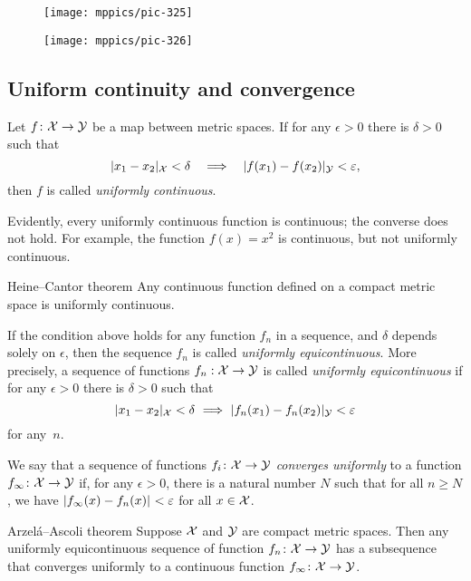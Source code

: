 \begin{multicols}{2}
{\begin{figure*}[b!]
\begin{minipage}{.48\textwidth}
\centering
\texttt{[image: mppics/pic-325]}
\end{minipage}\hfill
\begin{minipage}{.48\textwidth}
\centering
\texttt{[image: mppics/pic-326]}
\end{minipage}
\end{figure*}

\subsection*{Uniform continuity and convergence}

Let $f\colon{\mathcal{X}}\to \mathcal{Y}$ be a map between metric spaces.
If  for any $\epsilon>0$ there is $\delta>0$ such that 
\[\dist{x_1}{x_2}{\spc{X}}<\delta\quad\Longrightarrow\quad \dist{f(x_1)}{f(x_2)}{\spc{Y}}<\epsilon,\]
then $f$ is called \emph{uniformly continuous}.

Evidently, every uniformly continuous function is continuous;
the converse does not hold.
For example, the function $f(x)=x^2$ is continuous, but not uniformly continuous.

\begin{thm}{Heine--Cantor theorem}
Any continuous function defined on a compact metric space is uniformly continuous.
\end{thm}

If the condition above holds for any function $f_n$ in a sequence, and $\delta$ depends solely on $\epsilon$,
then the sequence $f_n$ is called \emph{uniformly equicontinuous}.
More precisely, 
a sequence of functions $f_n:{\mathcal{X}}\to \mathcal{Y}$ is called {}\emph{uniformly equicontinuous} if 
for any $\epsilon>0$ there is $\delta>0$ such that 
\[\dist{x_1}{x_2}{\spc{X}}<\delta\ \Longrightarrow\ \dist{f_n(x_1)}{f_n(x_2)}{\spc{Y}}<\epsilon\]
for any~$n$.


We say that a sequence of functions $f_i\colon {\mathcal{X}} \to \mathcal{Y}$ \emph{converges uniformly} to a function $f_{\infty}\colon {\mathcal{X}} \to \mathcal{Y}$ if, for any 
$\epsilon>0$, there is a natural number $N$ such that for all $n \ge N$, we have $\dist{f_{\infty}(x)}{f_n (x)}{}<\epsilon$
for all $x  \in {\mathcal{X}}$.

\begin{thm}{Arzel\'{a}--Ascoli theorem}\label{lem:equicontinuous}
Suppose $\mathcal{X}$ and $\mathcal{Y}$ are compact metric spaces. 
Then any uniformly equicontinuous sequence of function $f_n\:\spc{X}\z\to \spc{Y}$ has a subsequence that converges uniformly to a continuous function $f_\infty\:\spc{X}\z\to \spc{Y}$.
\end{thm}


}
\end{multicols}
